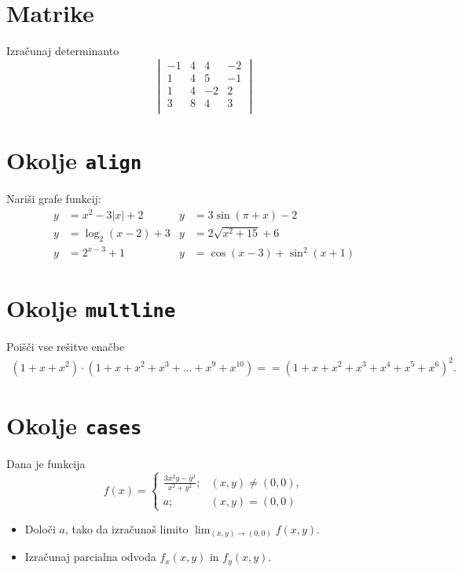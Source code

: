 \documentclass[a4paper,12pt]{article}
\begin{document}
\section*{Matrike}
Izračunaj determinanto
\[
\begin{vmatrix}
   -1 & 4 & 4 & -2 \\
    1 & 4 & 5 & -1 \\
    1 & 4 & -2 & 2 \\
    3 & 8 & 4 & 3 \\
\end{vmatrix}
\]

\section*{Okolje \texttt{align}}
Nariši grafe funkcij:
\begin{align*}
y &= x^2 - 3|x| + 2 &   y &= 3 \sin(\pi+x) - 2 \\
y &= \log_2(x-2) + 3&   y &= 2 \sqrt{x^2+15} + 6 \\
y &= 2^{x-3} + 1    &   y &= \cos(x-3) + \sin^2(x+1) 
\end{align*}

\section*{Okolje \texttt{multline}}
Poišči vse rešitve enačbe
\begin{multline*}
(1+x+x^2) \cdot (1+x+x^2+x^3+\ldots+x^9+x^{10}) =
=(1+x+x^2+x^3+x^4+x^5+x^6)^2.
\end{multline*}

\section*{Okolje \texttt{cases}}
Dana je funkcija
\begin{equation}
   f(x) = \begin{cases}
    \frac{3x^2y-y^3}{x^2+y^2}; &(x,y) \neq (0,0), \\
    a; &(x,y) = (0,0) 
   \end{cases}
\end{equation}
\begin{itemize}
\item Določi \(a\), tako da izračunaš limito \( \lim_{(x,y)\to(0,0)} f(x,y) \).
\item Izračunaj parcialna odvoda \(f_x(x,y)\) in \(f_y(x,y)\).
\end{itemize}
\end{document}
